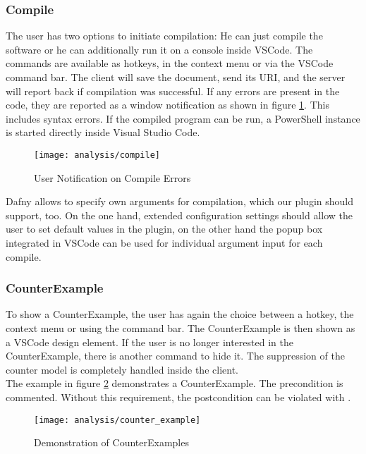\subsubsection{Compile}
The user has two options to initiate compilation: He can just compile the software or he can additionally run it on a console inside VSCode.
The commands are available as hotkeys, in the context menu or via the VSCode command bar.
The client will save the document, send its URI, and the server will report back if compilation was successful.
If any errors are present in the code, they are reported as a window notification as shown in figure \ref{fig:analysis_compile}.
This includes syntax errors. If the compiled program can be run, a PowerShell instance is started directly inside Visual Studio Code.

\begin{figure}[H]
    \centering
    \texttt{[image: analysis/compile]}
    \caption{User Notification on Compile Errors}
    \label{fig:analysis_compile}
\end{figure}

Dafny allows to specify own arguments for compilation, which our plugin should support, too.
On the one hand, extended configuration settings should allow the user to set default values in the plugin, on the other hand the popup box integrated in VSCode can be used for individual argument input for each compile.

\subsubsection{CounterExample}
To show a CounterExample, the user has again the choice between a hotkey, the context menu or using the command bar.
The CounterExample is then shown as a VSCode design element.
If the user is no longer interested in the CounterExample, there is another command to hide it.
The suppression of the counter model is completely handled inside the client. \\

The example in figure \ref{fig:analysis_counter_example} demonstrates a CounterExample.
The precondition is commented. Without this requirement, the postcondition can be violated with .

\begin{figure}[H]
    \centering
    \texttt{[image: analysis/counter\_example]}
    \caption{Demonstration of CounterExamples}
    \label{fig:analysis_counter_example}
\end{figure}

